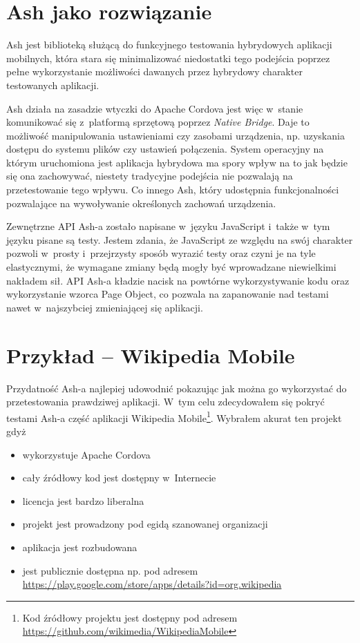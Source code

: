 \documentclass{xmgr}
\begin{document}
                                                                                                                                                                 
\section{Ash jako rozwiązanie}

Ash jest biblioteką służącą do funkcyjnego testowania hybrydowych aplikacji mobilnych, która stara się minimalizować niedostatki tego podejścia poprzez pełne wykorzystanie możliwości dawanych przez hybrydowy charakter testowanych aplikacji. 

Ash działa na zasadzie wtyczki do Apache Cordova jest więc w~stanie komunikować się z~platformą sprzętową poprzez \textit{Native Bridge}. Daje to możliwość manipulowania ustawieniami czy zasobami urządzenia, np. uzyskania dostępu do systemu plików czy ustawień połączenia. System operacyjny na którym uruchomiona jest aplikacja hybrydowa ma spory wpływ na to jak będzie się ona zachowywać, niestety tradycyjne podejścia nie pozwalają na przetestowanie tego wpływu. Co innego Ash, który udostępnia funkcjonalności pozwalające na wywoływanie określonych zachowań urządzenia. 

Zewnętrzne API Ash-a zostało napisane w~języku JavaScript i~także w~tym języku pisane są testy. Jestem zdania, że JavaScript ze względu na swój charakter pozwoli w~prosty i~przejrzysty sposób wyrazić testy oraz czyni je na tyle elastycznymi, że wymagane zmiany będą mogły być wprowadzane niewielkimi nakładem sił. API Ash-a kładzie nacisk na powtórne wykorzystywanie kodu oraz wykorzystanie wzorca Page Object, co pozwala na zapanowanie nad testami nawet w~najszybciej zmieniającej się aplikacji. 

\section{Przykład -- Wikipedia Mobile}

Przydatność Ash-a najlepiej udowodnić pokazując jak można go wykorzystać do przetestowania prawdziwej aplikacji. W~tym celu zdecydowałem się pokryć testami Ash-a część aplikacji Wikipedia Mobile\footnote{Kod źródłowy projektu jest dostępny pod adresem \url{https://github.com/wikimedia/WikipediaMobile} }. Wybrałem akurat ten projekt gdyż

\begin{itemize}
  \item wykorzystuje Apache Cordova
  \item cały źródłowy kod jest dostępny w~Internecie
  \item licencja jest bardzo liberalna
  \item projekt jest prowadzony pod egidą szanowanej organizacji
  \item aplikacja jest rozbudowana
  \item jest publicznie dostępna np. pod adresem \url{https://play.google.com/store/apps/details?id=org.wikipedia}
\end{itemize}
\end{document}
